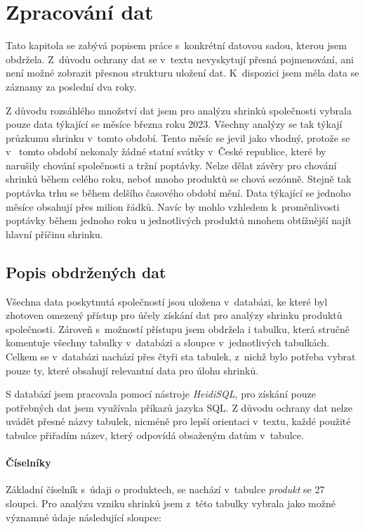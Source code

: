 \chapter{Zpracování dat}

Tato kapitola se zabývá popisem práce s~konkrétní datovou sadou, kterou jsem obdržela. Z~důvodu ochrany dat se v~textu nevyskytují přesná pojmenování, ani není možné zobrazit přesnou strukturu uložení dat. K~dispozici jsem měla data se záznamy za poslední dva roky. 

Z důvodu rozsáhlého množství dat jsem pro analýzu shrinků společnosti vybrala pouze data týkající se měsíce března roku 2023. Všechny analýzy se tak týkají průzkumu shrinku v~tomto období. Tento měsíc se jevil jako vhodný, protože se v~ tomto období nekonaly žádné statní svátky v~České republice, které by narušily chování společnosti a tržní poptávky. Nelze dělat závěry pro chování shrinků během celého roku, neboť mnoho produktů se chová sezónně. Stejně tak poptávka trhu se během delšího časového období mění.  Data týkající se jednoho měsíce obsahují přes milion řádků. Navíc by mohlo vzhledem k~proměnlivosti poptávky během jednoho roku u jednotlivých produktů mnohem obtížnější najít hlavní příčinu shrinku.

\section{Popis obdržených dat}

Všechna data poskytnutá společností jsou uložena v~databázi, ke které byl zhotoven omezený přístup pro účely získání dat pro analýzy shrinku produktů společnosti. Zároveň s~možností přístupu jsem obdržela i tabulku, která stručně komentuje všechny tabulky v~databázi a sloupce v~jednotlivých tabulkách. Celkem se v~databázi nachází přes čtyři sta tabulek, z~nichž bylo potřeba vybrat pouze ty, které obsahují relevantní data pro úlohu shrinků.

S databází jsem pracovala pomocí nástroje \emph{HeidiSQL}, pro získání pouze potřebných dat jsem využívala příkazů jazyka SQL.
Z důvodu ochrany dat nelze uvádět přesné názvy tabulek, nicméně pro lepší orientaci v~textu, každé použité tabulce přiřadím název, který odpovídá obsaženým datům v~tabulce. 

\subsubsection{Číselníky}

Základní číselník s~údaji o produktech, se nachází v~tabulce \emph{produkt} se 27 sloupci. Pro analýzu vzniku shrinků jsem z~této tabulky vybrala jako možné významné údaje následující sloupce:

